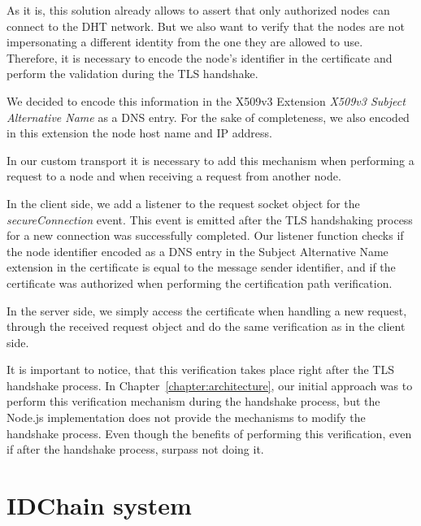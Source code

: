 

As it is, this solution already allows to assert that only authorized nodes can connect to the DHT network.
But we also want to verify that the nodes are not impersonating a different identity from the one they are allowed to use.
Therefore, it is necessary to encode the node's identifier in the certificate and perform the validation during the TLS handshake.

We decided to encode this information in the X509v3 Extension \textit{X509v3 Subject Alternative Name} as a DNS entry.
For the sake of completeness, we also encoded in this extension the node host name and IP address.

In our custom transport it is necessary to add this mechanism when performing a request to a node and when receiving a request from another node.

In the client side, we add a listener to the request socket object for the \textit{secureConnection} event.
This event is emitted after the TLS handshaking process for a new connection was successfully completed.
Our listener function checks if the node identifier encoded as a DNS entry in the Subject Alternative Name extension in the certificate is equal to the message sender identifier, and if the certificate was authorized when performing the certification path verification.


In the server side, we simply access the certificate when handling a new request, through the received request object and do the same verification as in the client side.

It is important to notice, that this verification takes place right after the TLS handshake process.
In Chapter~\ref{chapter:architecture}, our initial approach was to perform this verification mechanism during the handshake process, but the Node.js implementation does not provide the mechanisms to modify the handshake process.
Even though the benefits of performing this verification, even if after the handshake process, surpass not doing it.

\section{IDChain system}\label{implementation:idchain}

